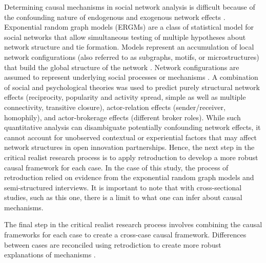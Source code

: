 Determining causal mechanisms in social network analysis is difficult because of the confounding nature of endogenous and exogenous network effects \citep{rogowski2012estimating,forastiere2018estimating}. Exponential random graph models (ERGMs) are a class of statistical model for social networks that allow simultaneous testing of multiple hypotheses about network structure and tie formation. Models represent an accumulation of local network configurations (also referred to as subgraphs, motifs, or microstructures) that build the global structure of the network \citep{robins2013tutorial}. Network configurations are assumed to represent underlying social processes or mechanisms \citep{lusher2013exponential}. A combination of social and psychological theories was used to predict purely structural network effects (reciprocity, popularity and activity spread, simple as well as multiple connectivity, transitive closure), actor-relation effects (sender/receiver, homophily), and actor-brokerage effects (different broker roles). While such quantitative analysis can disambiguate potentially confounding network effects, it cannot account for unobserved contextual or experiential factors that may affect network structures in open innovation partnerships. Hence, the next step in the critical realist research process is to apply retroduction to develop a more robust causal framework for each case. In the case of this study, the process of retroduction relied on evidence from the exponential random graph models and semi-structured interviews. It is important to note that with cross-sectional studies, such as this one, there is a limit to what one can infer about causal mechanisms. \medskip

The final step in the critical realist research process involves combining the causal frameworks for each case to create a cross\hyp{}case causal framework. Differences between cases are reconciled using retrodiction to create more robust explanations of mechanisms \citep{mcavoy2018critical}. \medskip


